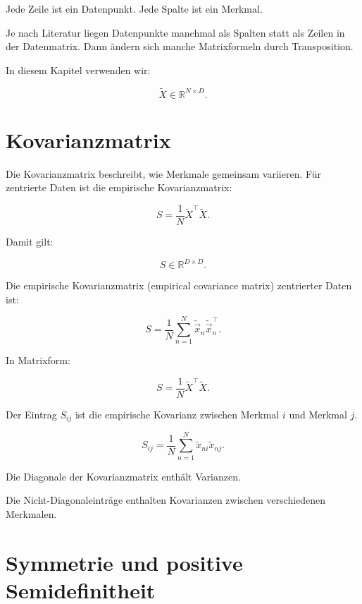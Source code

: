 Jede Zeile ist ein Datenpunkt.
Jede Spalte ist ein Merkmal.

\begin{notebox}
Je nach Literatur liegen Datenpunkte manchmal als Spalten statt als Zeilen in der Datenmatrix.
Dann ändern sich manche Matrixformeln durch Transposition.

In diesem Kapitel verwenden wir:

\[
    \tilde{X}\in\mathbb{R}^{N\times D}.
\]
\end{notebox}

\section{Kovarianzmatrix}

Die Kovarianzmatrix beschreibt, wie Merkmale gemeinsam variieren.
Für zentrierte Daten ist die empirische Kovarianzmatrix:

\[
    S
    =
    \frac{1}{N}
    \tilde{X}^{\top}\tilde{X}.
\]

Damit gilt:

\[
    S \in \mathbb{R}^{D\times D}.
\]

\begin{definitionbox}
Die empirische Kovarianzmatrix (empirical covariance matrix) zentrierter Daten ist:

\[
    S
    =
    \frac{1}{N}
    \sum_{n=1}^{N}
    \tilde{\vec{x}}_n\tilde{\vec{x}}_n^{\top}.
\]

In Matrixform:

\[
    S
    =
    \frac{1}{N}
    \tilde{X}^{\top}\tilde{X}.
\]
\end{definitionbox}

Der Eintrag \(S_{ij}\) ist die empirische Kovarianz zwischen Merkmal \(i\) und Merkmal \(j\).

\[
    S_{ij}
    =
    \frac{1}{N}
    \sum_{n=1}^{N}
    \tilde{x}_{ni}\tilde{x}_{nj}.
\]

\begin{conceptbox}
Die Diagonale der Kovarianzmatrix enthält Varianzen.

Die Nicht-Diagonaleinträge enthalten Kovarianzen zwischen verschiedenen Merkmalen.
\end{conceptbox}

\section{Symmetrie und positive Semidefinitheit}

